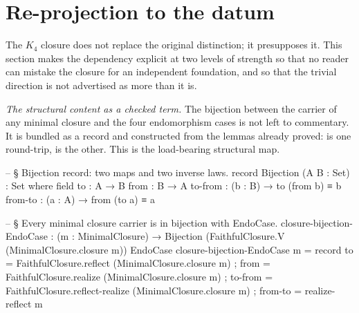 \documentclass[11pt]{article}
\begin{document}
\section{Re-projection to the datum}

The $K_4$ closure does not replace the original distinction; it
presupposes it.  This section makes the dependency explicit at two
levels of strength so that no reader can mistake the closure for an
independent foundation, and so that the trivial direction is not
advertised as more than it is.

\begin{center}
\end{center}

\emph{The structural content as a checked term.}  The bijection
between the carrier of any minimal closure and the four endomorphism
cases is not left to commentary.  It is bundled as a record and
constructed from the lemmas already proved: 
is one round-trip,  is the other.  This
is the load-bearing structural map.

\begin{code}
-- § Bijection record: two maps and two inverse laws.
record Bijection (A B : Set) : Set where
  field
    to      : A → B
    from    : B → A
    to-from : (b : B) → to (from b) ≡ b
    from-to : (a : A) → from (to a) ≡ a

-- § Every minimal closure carrier is in bijection with EndoCase.
closure-bijection-EndoCase :
  (m : MinimalClosure) →
  Bijection (FaithfulClosure.V (MinimalClosure.closure m)) EndoCase
closure-bijection-EndoCase m = record
  { to      = FaithfulClosure.reflect         (MinimalClosure.closure m)
  ; from    = FaithfulClosure.realize         (MinimalClosure.closure m)
  ; to-from = FaithfulClosure.reflect-realize (MinimalClosure.closure m)
  ; from-to = realize-reflect m
  }
\end{code}
\end{document}
